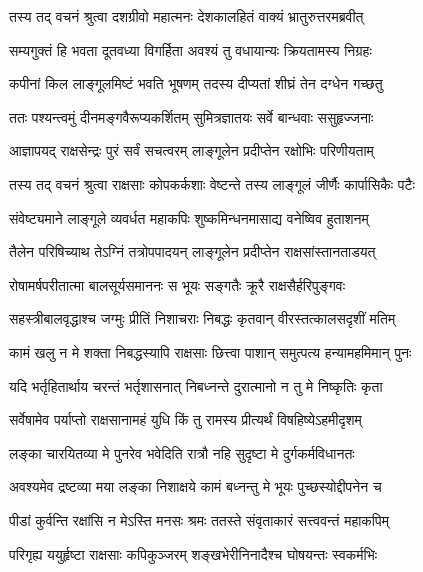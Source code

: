 
\twolineshloka
{तस्य तद् वचनं श्रुत्वा दशग्रीवो महात्मनः}
{देशकालहितं वाक्यं भ्रातुरुत्तरमब्रवीत्} %

\twolineshloka
{सम्यगुक्तं हि भवता दूतवध्या विगर्हिता}
{अवश्यं तु वधायान्यः क्रियतामस्य निग्रहः} %

\twolineshloka
{कपीनां किल लाङ्गूलमिष्टं भवति भूषणम्}
{तदस्य दीप्यतां शीघ्रं तेन दग्धेन गच्छतु} %

\twolineshloka
{ततः पश्यन्त्वमुं दीनमङ्गवैरूप्यकर्शितम्}
{सुमित्रज्ञातयः सर्वे बान्धवाः ससुहृज्जनाः} %

\twolineshloka
{आज्ञापयद् राक्षसेन्द्रः पुरं सर्वं सचत्वरम्}
{लाङ्गूलेन प्रदीप्तेन रक्षोभिः परिणीयताम्} %

\twolineshloka
{तस्य तद् वचनं श्रुत्वा राक्षसाः कोपकर्कशाः}
{वेष्टन्ते तस्य लाङ्गूलं जीर्णैः कार्पासिकैः पटैः} %

\twolineshloka
{संवेष्ट्यमाने लाङ्गूले व्यवर्धत महाकपिः}
{शुष्कमिन्धनमासाद्य वनेष्विव हुताशनम्} %

\twolineshloka
{तैलेन परिषिच्याथ तेऽग्निं तत्रोपपादयन्}
{लाङ्गूलेन प्रदीप्तेन राक्षसांस्तानताडयत्} %

\twolineshloka
{रोषामर्षपरीतात्मा बालसूर्यसमाननः}
{स भूयः सङ्गतैः क्रूरै राक्षसैर्हरिपुङ्गवः} %

\twolineshloka
{सहस्त्रीबालवृद्धाश्च जग्मुः प्रीतिं निशाचराः}
{निबद्धः कृतवान् वीरस्तत्कालसदृशीं मतिम्} %

\twolineshloka
{कामं खलु न मे शक्ता निबद्धस्यापि राक्षसाः}
{छित्त्वा पाशान् समुत्पत्य हन्यामहमिमान् पुनः} %

\twolineshloka
{यदि भर्तृहितार्थाय चरन्तं भर्तृशासनात्}
{निबध्नन्ते दुरात्मानो न तु मे निष्कृतिः कृता} %

\twolineshloka
{सर्वेषामेव पर्याप्तो राक्षसानामहं युधि}
{किं तु रामस्य प्रीत्यर्थं विषहिष्येऽहमीदृशम्} %

\twolineshloka
{लङ्का चारयितव्या मे पुनरेव भवेदिति}
{रात्रौ नहि सुदृष्टा मे दुर्गकर्मविधानतः} %

\twolineshloka
{अवश्यमेव द्रष्टव्या मया लङ्का निशाक्षये}
{कामं बध्नन्तु मे भूयः पुच्छस्योद्दीपनेन च} %

\twolineshloka
{पीडां कुर्वन्ति रक्षांसि न मेऽस्ति मनसः श्रमः}
{ततस्ते संवृताकारं सत्त्ववन्तं महाकपिम्} %

\twolineshloka
{परिगृह्य ययुर्हृष्टा राक्षसाः कपिकुञ्जरम्}
{शङ्खभेरीनिनादैश्च घोषयन्तः स्वकर्मभिः} %

